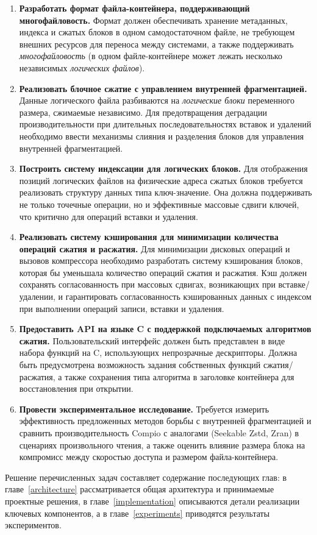 \begin{enumerate}
    \item \textbf{Разработать формат файла-контейнера, поддерживающий многофайловость.}
    Формат должен обеспечивать хранение метаданных, индекса и сжатых блоков в одном самодостаточном файле, не требующем внешних ресурсов для переноса между системами, а также поддерживать \textit{многофайловость} (в одном файле-контейнере может лежать несколько независимых \textit{логических файлов}).

    \item \textbf{Реализовать блочное сжатие с управлением внутренней фрагментацией.}
    Данные логического файла разбиваются на \textit{логические блоки} переменного размера, сжимаемые независимо. Для предотвращения деградации производительности при длительных последовательностях вставок и удалений необходимо ввести механизмы слияния и разделения блоков для управления внутренней фрагментацией.

    \item \textbf{Построить систему индексации для логических блоков.}
    Для отображения позиций логических файлов на физические адреса сжатых блоков требуется реализовать структуру данных типа ключ-значение. Она должна поддерживать не только точечные операции, но и эффективные массовые сдвиги ключей, что критично для операций вставки и удаления.

    \item \textbf{Реализовать систему кэширования для минимизации количества операций сжатия и расжатия.}
    Для минимизации дисковых операций и вызовов компрессора необходимо разработать систему кэширования блоков, которая бы уменьшала количество операций сжатия и расжатия. Кэш должен сохранять согласованность при массовых сдвигах, возникающих при вставке/удалении, и гарантировать согласованность кэшированных данных с индексом при выполнении операций записи, вставки и удаления.

    \item \textbf{Предоставить API на языке C с поддержкой подключаемых алгоритмов сжатия.}
    Пользовательский интерфейс должен быть представлен в виде набора функций на C, использующих непрозрачные дескрипторы. Должна быть предусмотрена возможность задания собственных функций сжатия/расжатия, а также сохранения типа алгоритма в заголовке контейнера для восстановления при открытии.

    \item \textbf{Провести экспериментальное исследование.}
    Требуется измерить эффективность предложенных методов борьбы с внутренней фрагментацией и сравнить производительность Compio с аналогами (Seekable Zstd, Zran) в сценариях произвольного чтения, а также оценить влияние размера блока на компромисс между скоростью доступа и размером файла-контейнера.
\end{enumerate}

Решение перечисленных задач составляет содержание последующих глав: в главе~\ref{architecture} рассматривается общая архитектура и принимаемые проектные решения, в главе~\ref{implementation} описываются детали реализации ключевых компонентов, а в главе~\ref{experiments} приводятся результаты экспериментов.